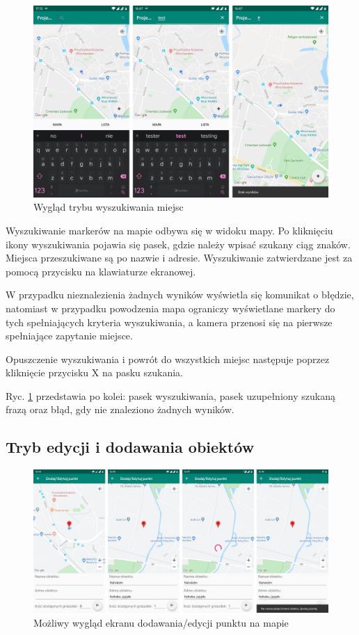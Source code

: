 \documentclass[polish,polish,a4paper,12pt]{article}
\begin{document}
	\begin{figure}[H]
		\centering
		\includegraphics[width = \textwidth]{screenshot-search}
		\caption{Wygląd trybu wyszukiwania miejsc}
		\label{fig:screenshotsearch}
	\end{figure}

	Wyszukiwanie markerów na mapie odbywa się w widoku mapy. Po kliknięciu ikony wyszukiwania pojawia się pasek, gdzie należy wpisać szukany ciąg znaków. Miejsca przeszukiwane są po nazwie i adresie. Wyszukiwanie zatwierdzane jest za pomocą przycisku na klawiaturze ekranowej.

	W przypadku nieznalezienia żadnych wyników wyświetla się komunikat o błędzie, natomiast w przypadku powodzenia mapa ograniczy wyświetlane markery do tych spełniających kryteria wyszukiwania, a kamera przenosi się na pierwsze spełniające zapytanie miejsce.

	Opuszczenie wyszukiwania i powrót do wszystkich miejsc następuje poprzez kliknięcie przycisku X na pasku szukania.

	Ryc. \ref{fig:screenshotsearch} przedstawia po kolei: pasek wyszukiwania, pasek uzupełniony szukaną frazą oraz błąd, gdy nie znaleziono żadnych wyników.

	\subsection{Tryb edycji i dodawania obiektów}

	\begin{figure}[H]
		\centering
		\includegraphics[width = \textwidth]{screenshot-addedit}
		\caption{Możliwy wygląd ekranu dodawania/edycji punktu na mapie}
		\label{fig:screenshotaddedit}
	\end{figure}
\end{document}
